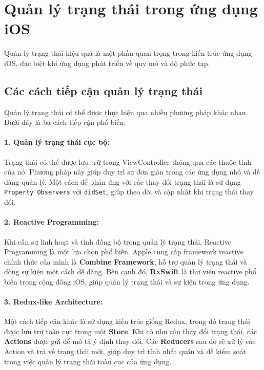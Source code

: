 \section{Quản lý trạng thái trong ứng dụng iOS}

\hspace*{0.8cm}Quản lý trạng thái hiệu quả là một phần quan trọng trong kiến trúc ứng dụng iOS, đặc biệt khi ứng dụng phát triển về quy mô và độ phức tạp.

\subsection{Các cách tiếp cận quản lý trạng thái}

\hspace*{0.8cm}Quản lý trạng thái có thể được thực hiện qua nhiều phương pháp khác nhau. Dưới đây là ba cách tiếp cận phổ biến:

\paragraph*{1. Quản lý trạng thái cục bộ:}Trạng thái có thể được lưu trữ trong ViewController thông qua các thuộc tính của nó. Phương pháp này giúp duy trì sự đơn giản trong các ứng dụng nhỏ và dễ dàng quản lý. Một cách để phản ứng với các thay đổi trạng thái là sử dụng \texttt{Property Observers} với \texttt{didSet}, giúp theo dõi và cập nhật khi trạng thái thay đổi.

\paragraph*{2. Reactive Programming:}Khi cần sự linh hoạt và tính đồng bộ trong quản lý trạng thái, Reactive Programming là một lựa chọn phổ biến. Apple cung cấp framework reactive chính thức của mình là \textbf{Combine Framework}\cite{Combine-Framework}, hỗ trợ quản lý trạng thái và dòng sự kiện một cách dễ dàng. Bên cạnh đó, \textbf{RxSwift} là thư viện reactive phổ biến trong cộng đồng iOS, giúp quản lý trạng thái và sự kiện trong ứng dụng.

\paragraph*{3. Redux-like Architecture:}Một cách tiếp cận khác là sử dụng kiến trúc giống Redux, trong đó trạng thái được lưu trữ toàn cục trong một \textbf{Store}. Khi có nhu cầu thay đổi trạng thái, các \textbf{Actions} được gửi để mô tả ý định thay đổi. Các \textbf{Reducers} sau đó sẽ xử lý các Action và trả về trạng thái mới, giúp duy trì tính nhất quán và dễ kiểm soát trong việc quản lý trạng thái toàn cục của ứng dụng.


